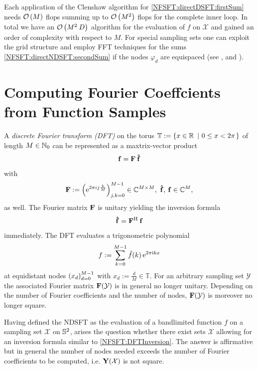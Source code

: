 Each application of the Clenshaw algorithm for \eqref{NFSFT:directDSFT:firstSum} needs $\mathcal{O}\left(M\right)$ 
flops summing up to $\mathcal{O}\left(M^2\right)$ flops for the complete inner loop. In 
total we have an $\mathcal{O}\left(M^2\:D\right)$ algorithm for the evaluation of $f$ on $\mathcal{X}$ and gained an order of complexity with respect to $M$. 
For special sampling sets one can exploit the grid 
structure and employ FFT techniques for the sums \eqref{NFSFT:directNDSFT:secondSum} if the nodes $\varphi_{d}$ are equispaced 
(see \cite{drhe}, \cite{postta97} and \cite{kupo02}). 


\section{Computing Fourier Coeffcients from Function Samples}
A \emph{discrete Fourier transform (DFT)} on the torus $\mathbb{T} := \left\{x \in \mathbb{R}\ \left|\ 0 \le x < 2\pi\right.\right\rbrace$ of length $M \in \mathbb{N}_{0}$ can be represented 
as a maxtrix-vector product
\[
  \mathbf{f} = \mathbf{F} \: \mathbf{\hat{f}}
\]
with
\[
 \mathbf{F} := \left(\mbox{\rm{e}}^{2 \pi i j \frac{k}{M}}\right)_{j,k = 0}^{M-1} \in \mathbb{C}^{M \times M},\ \mathbf{\hat{f}},\:\mathbf{f} \in \mathbb{C}^{M},
\]
as well. The Fourier matrix $\mathbf{F}$ is unitary yielding the inversion formula
\begin{equation}
  \label{NFSFT:DFTInversion}
  \mathbf{\hat{f}} = \mathbf{F}^{\text{\rm{H}}} \: \mathbf{f}
\end{equation}
immediately. The DFT evaluates a trigonometric polynomial 
\[
  f := \sum_{k=0}^{M-1} \hat{f}{\hspace{-0.4ex}}\left(k\right) \mbox{\rm{e}}^{2 \pi \mbox{\scriptsize\rm{i}} k x}
\]
at equidistant nodes $\left(x_{d}\right)_{d=0}^{M-1}$ with $x_{d} := \frac{d}{M} \in \mathbb{T}$. 
For an arbitrary sampling set $\mathcal{Y}$ the associated Fourier matrix $\mathbf{F}{\hspace{-0.4ex}}\left(\mathcal{Y}\right)$ is in general no longer unitary. 
Depending on the number of Fourier coefficients and the number of nodes,
$\mathbf{F}{\hspace{-0.4ex}}\left(\mathcal{Y}\right)$ is moreover no longer square.

Having defined the NDSFT as the evaluation of a bandlimited function $f$ on a sampling set $\mathcal{X}$ on $\mathbb{S}^2$, arises the question 
whether there exist sets $\mathcal{X}$ allowing for an inversion formula similar to \eqref{NFSFT:DFTInversion}.
The answer is affirmative but in general the number of nodes needed exceeds the number of Fourier coefficients to be computed, 
i.e. $\mathbf{Y}{\hspace{-0.4ex}}\left(\mathcal{X}\right)$ is not square.

